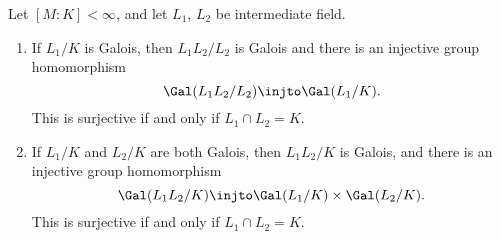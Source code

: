 \documentclass[12pt]{article}
\begin{document}
\begin{theorem}\label{thm:composite_gal}
	Let $[M:K] < \infty$, and let $L_1$, $L_2$ be intermediate field.

	\begin{enumerate}[\normalfont(i)]
		\item If $L_1/K$ is Galois, then $L_1L_2/L_2$ is Galois and there is an injective group homomorphism
			\[
			\Gal(L_1L_2/L_2) \injto \Gal(L_1/K).
			\]
			This is surjective if and only if $L_1 \cap L_2 = K$.
		\item If $L_1/K$ and $L_2/K$ are both Galois, then $L_1L_2/K$ is Galois, and there is an injective group homomorphism
			\[
			\Gal(L_1L_2/K) \injto \Gal(L_1/K) \times \Gal(L_2/K).
			\]
			This is surjective if and only if $L_1 \cap L_2 = K$.
	\end{enumerate}
\end{theorem}
\end{document}

